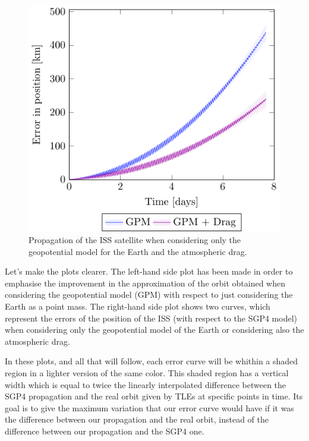 \documentclass[../main.tex]{subfiles}
\begin{document}
\begin{figure}[htbp]
\begin{minipage}[ht]{0.45\textwidth}
    \includegraphics[width=\textwidth]{Images/simulation/ISS.pdf}
    \caption{Propagation of the ISS satellite when considering only the geopotential model for the Earth and the atmospheric drag.}
    \label{fig:ISS}
  \end{minipage}
\end{figure}

Let's make the plots clearer. The left-hand side plot has been made in order to emphasise the improvement in the approximation of the orbit obtained when considering the geopotential model (GPM) with respect to just considering the Earth as a point mass. The right-hand side plot shows two curves, which represent the errors of the position of the ISS (with respect to the SGP4 model) when considering only the geopotential model of the Earth or considering also the atmospheric drag.

In these plots, and all that will follow, each error curve will be whithin a shaded region in a lighter version of the same color. This shaded region has a vertical width which is equal to twice the linearly interpolated difference between the SGP4 propagation and the real orbit given by TLEs at specific points in time. Its goal is to give the maximum variation that our error curve would have if it was the difference between our propagation and the real orbit, instead of the difference between our propagation and the SGP4 one.
\end{document}
